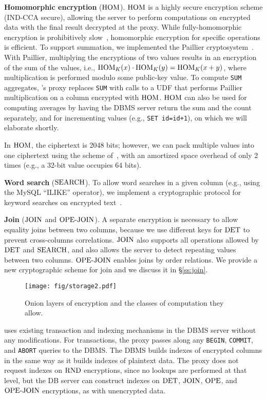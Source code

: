 \textbf{Homomorphic encryption} ($\textrm{HOM}$)\@. $\textrm{HOM}$ is a highly secure
encryption scheme (IND-CCA secure), allowing the server to perform
computations on encrypted data with the final result decrypted at the
proxy. While fully-homomorphic encryption is prohibitively
slow~\cite{trillion}, homomorphic encryption for specific operations
is efficient.  To support summation, we implemented the Paillier
cryptosystem~\cite{Paillier99}.  With Paillier, multiplying the
encryptions of two values results in an encryption of the sum of the
values, i.e., $\textrm{HOM}_K(x) \cdot \textrm{HOM}_K(y) = \textrm{HOM}_K(x+y)$, where
multiplication is performed modulo some public-key value.  To compute
{\tt SUM} aggregates, \name's proxy replaces {\tt SUM} with calls to a
UDF that performs Paillier multiplication on a column encrypted with
$\textrm{HOM}$.  $\textrm{HOM}$ can also be used for computing averages by having the
DBMS server return the sum and the count separately, and for
incrementing values (e.g., {\tt SET id=id+1}), on which we will
elaborate shortly.

In $\textrm{HOM}$, the ciphertext is 2048 bits; however, we can pack
multiple values into one ciphertext using the scheme
of~\cite{GeZ07}, with an amortized space overhead of only 2 times
(e.g., a 32-bit value occupies 64 bits).

\textbf{Word search} ($\textrm{SEARCH}$)\@.  To allow word searches in a given
column (e.g., using the MySQL ``ILIKE'' operator), we implement a
cryptographic protocol for keyword searches on encrypted
text~\cite{Dawn-Song-Search-2000, amanatidis-boldyreva-o'neill}.

\textbf{Join} ($\textrm{JOIN}$ and $\textrm{OPE-JOIN}$)\@.  A separate encryption
is necessary to allow equality joins between two columns, because we
use different keys for $\textrm{DET}$ to prevent cross-columns correlations.   $\textrm{JOIN}$ also supports all operations allowed by $\textrm{DET}$ and
$\textrm{SEARCH}$, and also allows the server to detect repeating values
between two columns.  $\textrm{OPE-JOIN}$ enables joins by order relations. We provide a new cryptographic scheme for join and we discuss it in \S\ref{ss:join}.

\begin{figure}[t!]
\centering
\texttt{[image: fig/storage2.pdf]}
\caption{Onion layers of encryption and the classes of computation they allow.}
\label{fig:onion}
\end{figure}

\name{} uses existing transaction and indexing mechanisms in the DBMS
server without any modifications.  For transactions, the proxy passes
along any {\tt BEGIN}, {\tt COMMIT}, and {\tt ABORT} queries to the
DBMS\@.
The DBMS builds indexes of encrypted columns in the same way as it
builds indexes of plaintext data.  The proxy does not request indexes
on $\textrm{RND}$ encryptions, since no lookups are performed at that level,
but the DB server can construct indexes on $\textrm{DET}$, $\textrm{JOIN}$, $\textrm{OPE}$, and
$\textrm{OPE-JOIN}$ encryptions, as with unencrypted data.

